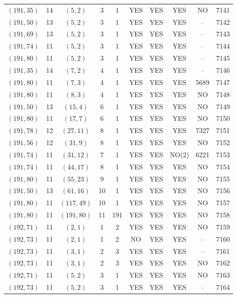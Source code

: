 \begin{longtable}{|c|c|c|c|c|c|c|c|c|c|}
$(191, 35)$ & 14 & $(5, 2)$ & 3 & 1 & YES & YES & YES & NO & 7141\\
$(191, 50)$ & 13 & $(5, 2)$ & 3 & 1 & YES & YES & YES & -- & 7142\\
$(191, 69)$ & 13 & $(5, 2)$ & 3 & 1 & YES & YES & YES & -- & 7143\\
$(191, 74)$ & 11 & $(5, 2)$ & 3 & 1 & YES & YES & YES & -- & 7144\\
$(191, 80)$ & 11 & $(5, 2)$ & 3 & 1 & YES & YES & YES & -- & 7145\\
$(191, 35)$ & 14 & $(7, 2)$ & 4 & 1 & YES & YES & YES & -- & 7146\\
$(191, 80)$ & 11 & $(7, 3)$ & 4 & 1 & YES & YES & YES & 5689 & 7147\\
$(191, 80)$ & 11 & $(8, 3)$ & 4 & 1 & YES & YES & YES & NO & 7148\\
$(191, 50)$ & 13 & $(15, 4)$ & 6 & 1 & YES & YES & YES & NO & 7149\\
$(191, 80)$ & 11 & $(17, 7)$ & 6 & 1 & YES & YES & YES & NO & 7150\\
$(191, 78)$ & 12 & $(27, 11)$ & 8 & 1 & YES & YES & YES & 7327 & 7151\\
$(191, 56)$ & 12 & $(31, 9)$ & 8 & 1 & YES & YES & YES & NO & 7152\\
$(191, 74)$ & 11 & $(31, 12)$ & 7 & 1 & YES & YES & NO(2) & 6221 & 7153\\
$(191, 74)$ & 11 & $(44, 17)$ & 8 & 1 & YES & YES & YES & NO & 7154\\
$(191, 80)$ & 11 & $(55, 23)$ & 9 & 1 & YES & YES & YES & NO & 7155\\
$(191, 50)$ & 13 & $(61, 16)$ & 10 & 1 & YES & YES & YES & NO & 7156\\
$(191, 80)$ & 11 & $(117, 49)$ & 10 & 1 & YES & YES & YES & NO & 7157\\
$(191, 80)$ & 11 & $(191, 80)$ & 11 & 191 & YES & YES & YES & NO & 7158\\
$(192, 71)$ & 11 & $(2, 1)$ & 1 & 2 & YES & YES & YES & NO & 7159\\
$(192, 73)$ & 11 & $(2, 1)$ & 1 & 2 & NO & YES & YES & -- & 7160\\
$(192, 73)$ & 11 & $(3, 1)$ & 2 & 3 & YES & YES & YES & -- & 7161\\
$(192, 73)$ & 11 & $(3, 1)$ & 2 & 3 & YES & YES & YES & NO & 7162\\
$(192, 71)$ & 11 & $(5, 2)$ & 3 & 1 & YES & YES & YES & NO & 7163\\
$(192, 73)$ & 11 & $(5, 2)$ & 3 & 1 & YES & YES & YES & -- & 7164\\

\end{longtable}

